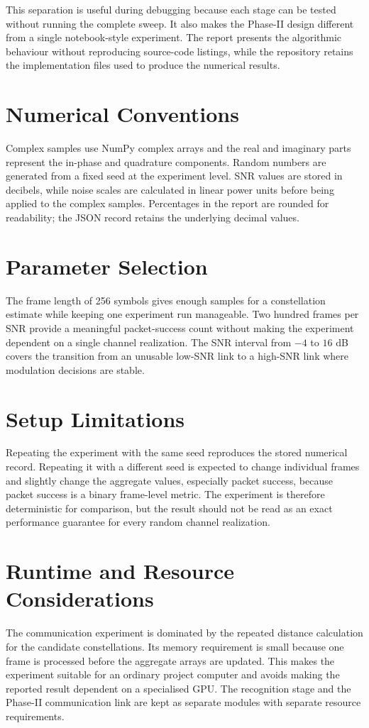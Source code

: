 \documentclass[12pt,twoside,openright]{report}
\begin{document}
This separation is useful during debugging because each stage can be tested
without running the complete sweep. It also makes the Phase-II design
different from a single notebook-style experiment. The report presents the
algorithmic behaviour without reproducing source-code listings, while the
repository retains the implementation files used to produce the numerical
results.

\section{Numerical Conventions}
Complex samples use NumPy complex arrays and the real and imaginary parts
represent the in-phase and quadrature components. Random numbers are
generated from a fixed seed at the experiment level. SNR values are stored
in decibels, while noise scales are calculated in linear power units before
being applied to the complex samples. Percentages in the report are rounded
for readability; the JSON record retains the underlying decimal values.

\section{Parameter Selection}
The frame length of 256 symbols gives enough samples for a constellation
estimate while keeping one experiment run manageable. Two hundred frames
per SNR provide a meaningful packet-success count without making the
experiment dependent on a single channel realization. The SNR interval from
$-4$ to $16$ dB covers the transition from an unusable low-SNR link to a
high-SNR link where modulation decisions are stable.

\section{Setup Limitations}
Repeating the experiment with the same seed reproduces the stored numerical
record. Repeating it with a different seed is expected to change individual
frames and slightly change the aggregate values, especially packet success,
because packet success is a binary frame-level metric. The experiment is
therefore deterministic for comparison, but the result should not be read as
an exact performance guarantee for every random channel realization.

\section{Runtime and Resource Considerations}
The communication experiment is dominated by the repeated distance
calculation for the candidate constellations. Its memory requirement is
small because one frame is processed before the aggregate arrays are
updated. This makes the experiment suitable for an ordinary project
computer and avoids making the reported result dependent on a specialised
GPU. The recognition stage and the Phase-II communication link are kept as
separate modules with separate resource requirements.
\end{document}
